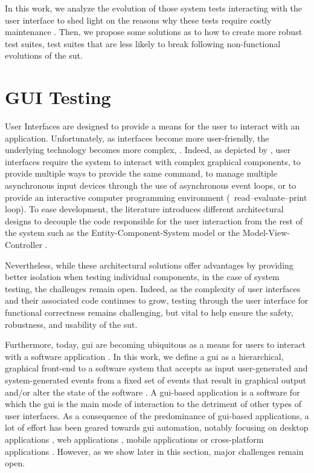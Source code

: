 In this work, we analyze the evolution of those system tests interacting with the user interface to shed light on the reasons why these tests require costly maintenance \cite{Alegroth2016, Coppola2020}. Then, we propose some solutions as to how to create more robust test suites, \ie test suites that are less likely to break following non-functional evolutions of the \gls{sut}.

\section{GUI Testing}
\label{sec:introduction-gui-testing}

User Interfaces are designed to provide a means for the user to interact with an application. Unfortunately, as interfaces become more user-friendly, the underlying technology becomes more complex, \cite{Myers1994}. Indeed, as depicted by \textcite{Myers1995}, user interfaces require the system to  interact with complex graphical components, to provide multiple ways to provide the same command, to manage multiple asynchronous input devices through the use of asynchronous event loops, or to provide an interactive computer programming environment (\eg\ read–evaluate–print loop). To ease development, the literature introduces different architectural designs to decouple the code responsible for the user interaction from the rest of the system such as the Entity-Component-System model \cite{Raffaillac2018} or the Model-View-Controller \cite{Krasner1988}.

Nevertheless, while these architectural solutions offer advantages by providing better isolation when testing individual components, in the case of system testing, the challenges remain open. Indeed, as the complexity of user interfaces and their associated code continues to grow, testing through the user interface for functional correctness remains challenging, but vital to help ensure the safety, robustness, and usability of the \gls{sut}.

Furthermore, today, \gls{gui} are becoming ubiquitous as a means for users to interact with a software application \cite{Myers1992, Myers1995, Brooks2009, Memon2010}. In this work, we define a \gls{gui} as a hierarchical, graphical front-end to a software system that accepts as input user-generated and system-generated events from a fixed set of events that result in graphical output \cite{Memon2007} and/or alter the state of the software \cite{Nguyen2014}. A \gls{gui}-based application is a software for which the \gls{gui} is the main mode of interaction to the detriment of other types of user interfaces. As a consequence of the predominance of \gls{gui}-based applications, a lot of effort has been geared towards \gls{gui} automation, notably focusing on desktop applications \cite{Nguyen2014, Advolodkin2018, Pezze2018}, web applications \cite{Mesbah2009, Biagiola2019}, mobile applications \cite{Machiry2013, Gomez2013, Mao2016, Salihu2019, Yu2019} or cross-platform applications \cite{Canny2020}. However, as we show later in this section, major challenges remain open.

